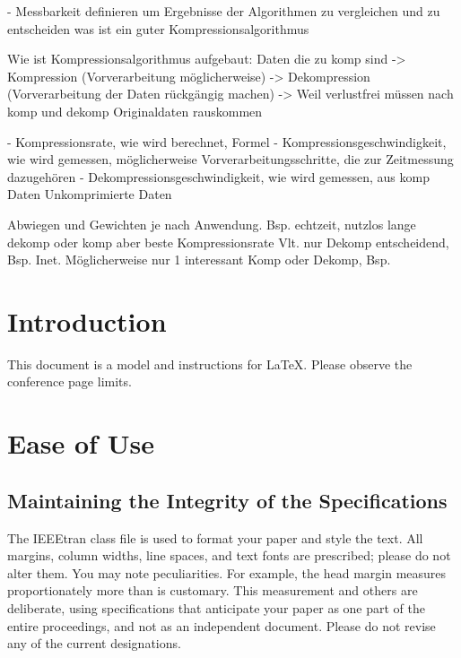 \documentclass[conference]{IEEEtran}
\begin{document}
- Messbarkeit definieren um Ergebnisse der Algorithmen zu vergleichen und zu entscheiden
was ist ein guter Kompressionsalgorithmus

Wie ist Kompressionsalgorithmus aufgebaut: 
    Daten die zu komp sind -> Kompression (Vorverarbeitung möglicherweise) 
    -> Dekompression (Vorverarbeitung der Daten rückgängig machen)
    -> Weil verlustfrei müssen nach komp und dekomp Originaldaten rauskommen

- Kompressionsrate, wie wird berechnet, Formel
- Kompressionsgeschwindigkeit, wie wird gemessen, möglicherweise Vorverarbeitungsschritte,
die zur Zeitmessung dazugehören
- Dekompressionsgeschwindigkeit, wie wird gemessen, aus komp Daten Unkomprimierte Daten

Abwiegen und Gewichten je nach Anwendung.
Bsp. echtzeit, nutzlos lange dekomp oder komp aber beste Kompressionsrate
Vlt. nur Dekomp entscheidend, Bsp. Inet.
Möglicherweise nur 1 interessant Komp oder Dekomp, Bsp.









\section{Introduction}
This document is a model and instructions for \LaTeX.
Please observe the conference page \cite{autor2023} limits.

\section{Ease of Use}

\subsection{Maintaining the Integrity of the Specifications}

The IEEEtran class file is used to format your paper and style the text. All margins,
column widths, line spaces, and text fonts are prescribed; please do not
alter them. You may note peculiarities. For example, the head margin
measures proportionately more than is customary. This measurement
and others are deliberate, using specifications that anticipate your paper
as one part of the entire proceedings, and not as an independent document.
Please do not revise any of the current designations.




\end{document}
